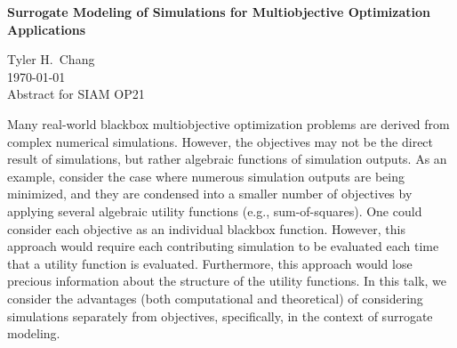 \documentclass[11pt]{article}
\begin{document}
\begin{centering}
\textbf{Surrogate Modeling of Simulations for Multiobjective Optimization Applications}
\end{centering}
\begin{flushright}
Tyler H.\ Chang\\
\today\\
Abstract for SIAM OP21
\end{flushright}

Many real-world blackbox multiobjective optimization problems are derived
from complex numerical simulations.
However, the objectives may not be the direct result of simulations,
but rather algebraic functions of simulation outputs.
As an example, consider the case where numerous simulation outputs are
being minimized, and they are condensed into a smaller number of objectives
by applying several algebraic utility functions (e.g., sum-of-squares).
One could consider each objective as an individual blackbox function.
However, this approach would require each contributing simulation to be
evaluated each time that a utility function is evaluated.
Furthermore, this approach would lose precious information about the
structure of the utility functions.
In this talk, we consider the advantages (both computational and theoretical)
of considering simulations separately from objectives, specifically, in
the context of surrogate modeling.
\end{document}
